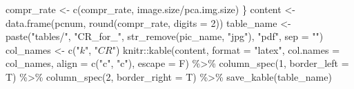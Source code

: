 \documentclass[
]{article}
\newenvironment{Shaded}{\begin{snugshade}}{\end{snugshade}}
\newcommand{\AttributeTok}[1]{\textcolor[rgb]{0.77,0.63,0.00}{#1}}
\newcommand{\DecValTok}[1]{\textcolor[rgb]{0.00,0.00,0.81}{#1}}
\newcommand{\FunctionTok}[1]{\textcolor[rgb]{0.00,0.00,0.00}{#1}}
\newcommand{\NormalTok}[1]{#1}
\newcommand{\OtherTok}[1]{\textcolor[rgb]{0.56,0.35,0.01}{#1}}
\newcommand{\SpecialCharTok}[1]{\textcolor[rgb]{0.00,0.00,0.00}{#1}}
\newcommand{\StringTok}[1]{\textcolor[rgb]{0.31,0.60,0.02}{#1}}
\begin{document}
\begin{Shaded}
\begin{Highlighting}[]
\NormalTok{    compr\_rate }\OtherTok{\textless{}{-}} \FunctionTok{c}\NormalTok{(compr\_rate, image.size}\SpecialCharTok{/}\NormalTok{pca.img.size)}
\NormalTok{\}}
\NormalTok{content }\OtherTok{\textless{}{-}} \FunctionTok{data.frame}\NormalTok{(pcnum, }\FunctionTok{round}\NormalTok{(compr\_rate, }\AttributeTok{digits =} \DecValTok{2}\NormalTok{))}
\NormalTok{table\_name }\OtherTok{\textless{}{-}} \FunctionTok{paste}\NormalTok{(}\StringTok{"tables/"}\NormalTok{, }\StringTok{"CR\_for\_"}\NormalTok{, }\FunctionTok{str\_remove}\NormalTok{(pic\_name, }\StringTok{"jpg"}\NormalTok{), }\StringTok{"pdf"}\NormalTok{, }\AttributeTok{sep =} \StringTok{""}\NormalTok{)}
\NormalTok{col\_names }\OtherTok{\textless{}{-}} \FunctionTok{c}\NormalTok{(}\StringTok{"$k$"}\NormalTok{, }\StringTok{"$CR$"}\NormalTok{)}
\NormalTok{knitr}\SpecialCharTok{::}\FunctionTok{kable}\NormalTok{(content, }\AttributeTok{format =} \StringTok{"latex"}\NormalTok{, }\AttributeTok{col.names =}\NormalTok{ col\_names, }\AttributeTok{align =} \FunctionTok{c}\NormalTok{(}\StringTok{"c"}\NormalTok{, }\StringTok{"c"}\NormalTok{), }
    \AttributeTok{escape =}\NormalTok{ F) }\SpecialCharTok{\%\textgreater{}\%} \FunctionTok{column\_spec}\NormalTok{(}\DecValTok{1}\NormalTok{, }\AttributeTok{border\_left =}\NormalTok{ T) }\SpecialCharTok{\%\textgreater{}\%} \FunctionTok{column\_spec}\NormalTok{(}\DecValTok{2}\NormalTok{, }\AttributeTok{border\_right =}\NormalTok{ T) }\SpecialCharTok{\%\textgreater{}\%} 
    \FunctionTok{save\_kable}\NormalTok{(table\_name)}
\end{Highlighting}
\end{Shaded}
\end{document}
